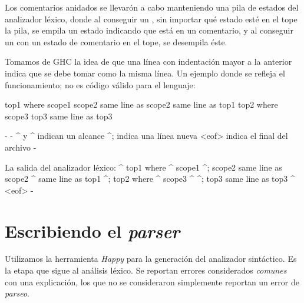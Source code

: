 {\begin{implementationfr}
Los comentarios anidados se llevarón a cabo manteniendo una pila de estados del analizador léxico, donde al conseguir un \inlinecode{\{-}, sin importar qué estado esté en el tope la pila, se empila un estado indicando que está en un comentario, y al conseguir un \inlinecode{-\}} con un estado de comentario en el tope, se desempila éste.

Tomamos de GHC la idea de que una línea con indentación mayor a la anterior indica que se debe tomar como la misma línea. Un ejemplo donde se refleja el funcionamiento; no es código válido para el lenguaje:

\begin{anglercode}[deletekeywords={as}]
top1 where
        scope1
        scope2
            same line as scope2
    same line as top1
top2 where
    scope3
top3
    same line as top3

{-
    {-
        {^ y ^} indican un alcance
        ^;      indica una línea nueva
        <eof>   indica el final del archivo
    -}

    La salida del analizador léxico:
    {^
        top1 where {^
            scope1 ^;
            scope2 same line as scope2
        ^} same line as top1 ^;
        top2 where {^
            scope3
        ^} ^;
        top3 same line as top3
    ^} <eof>
-}
\end{anglercode}
\end{implementationfr}

\section{Escribiendo el \emph{parser}}

\begin{implementationfr}
Utilizamos la herramienta \emph{Happy} \cite{happy} para la generación del analizador sintáctico. Es la etapa que sigue al análisis léxico. Se reportan errores considerados \emph{comunes} con una explicación, los que no se consideraron simplemente reportan un error de \emph{parseo}.

{   %
\renewcommand{\emph}[1]{\textbf{\textit{#1}}}
\renewcommand{\_}{\:\:}

\newcommand{\maybe}[1]{\left[ \_ #1 \_ \right]}
\newcommand{\listZ}[1]{#1^{*}}
\renewcommand{\list}[1]{#1^{+}}
\newcommand{\listSepZ}[2]{#1^{* [ \_ #2 \_ ]}}
\newcommand{\listSep}[2]{#1^{+ [ \_ #2 \_ ]}}

\newcommand{\lt}[1]{\textbf{\color{darkcandyapplered}\text{#1}}}

}
\end{implementationfr}}

